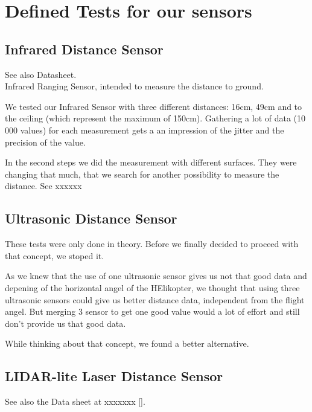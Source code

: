 
\chapter{Defined Tests for our sensors}
\label{sec:tests}


\section{Infrared Distance Sensor}
\label{sec:TestInfra}

See also Datasheet.\\

Infrared Ranging Sensor, intended to measure the distance to ground.

We tested our Infrared Sensor with three different distances: 16cm, 49cm and to the ceiling (which represent the maximum of 150cm). Gathering a lot of data (10 000 values) for each measurement gets a an impression of the jitter and the precision of the value.

In the second steps we did the measurement with different surfaces. They were changing that much, that we search for another possibility to measure the distance. See xxxxxx


\section{Ultrasonic Distance Sensor}
\label{sec:TestUltrasonic}

These tests were only done in theory. Before we finally decided to proceed with that concept, we stoped it.

As we knew that the use of one ultrasonic sensor gives us not that good data and depening of the horizontal angel of the HElikopter, we thought that using three ultrasonic sensors could give us better distance data, independent from the flight angel. But merging 3 sensor to get one good value would a lot of effort and still don't provide us that good data.

While thinking about that concept, we found a better alternative.



\section{LIDAR-lite Laser Distance Sensor}
\label{sec:TestLaser}

See also the Data sheet at xxxxxxx \ref{}.\\

